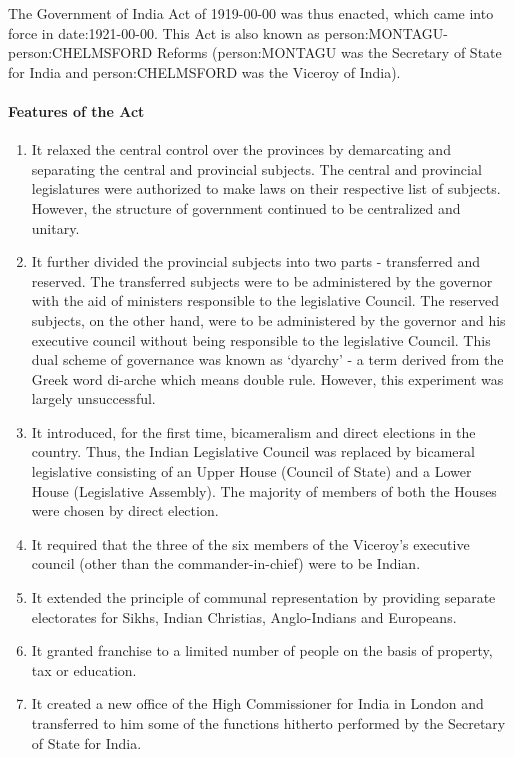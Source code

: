 \begin{multicol}{2}
The Government of India Act of 1919-00-00 was thus enacted, which came into force in \gls{date:1921-00-00}. This Act is also known as \gls{person:MONTAGU}-\gls{person:CHELMSFORD} Reforms (\gls{person:MONTAGU} was the Secretary of State for India and \gls{person:CHELMSFORD} was the Viceroy of India).

\paragraph{Features of the Act}
\begin{enumerate}
  \item It relaxed the central control over the provinces by demarcating and separating the central and provincial subjects. The central and provincial legislatures were authorized to make laws on their respective list of subjects. However, the structure of government continued to be
  centralized and unitary.
  \item It further divided the provincial subjects into two parts - transferred and reserved. The transferred subjects were to be administered by the governor with the aid of ministers responsible to the legislative Council. The reserved subjects, on the other hand, were to be administered by the governor and his executive council without being responsible to the legislative Council. This dual scheme of governance was known as
   `dyarchy' - a term derived from the Greek word di-arche which means double rule. However, this experiment was largely unsuccessful.
  \item It introduced, for the first time, bicameralism and direct elections in the country. Thus, the Indian Legislative Council was replaced by bicameral legislative consisting of an Upper House (Council of State) and a Lower House (Legislative Assembly). The majority of members of both the Houses were chosen by direct election.
  \item It required that the three of the six members of the Viceroy's executive council (other than the commander-in-chief) were to be Indian.
  \item It extended the principle of communal representation by providing separate electorates for Sikhs, Indian Christias, Anglo-Indians and Europeans.
  \item It granted franchise to a limited number of people on the basis of property, tax or education.
  \item It created a new office of the High Commissioner for India in London and transferred to him some of the functions hitherto performed by the Secretary of State for India.

\end{enumerate}
\end{multicol}
